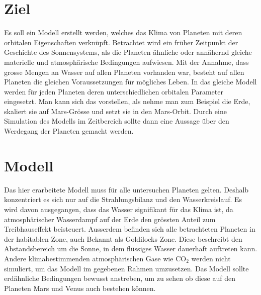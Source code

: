 \begin{refsection}

\section{Ziel}
Es soll ein Modell erstellt werden, welches das Klima von Planeten mit deren orbitalen Eigenschaften verknüpft.
Betrachtet wird ein früher Zeitpunkt der Geschichte des Sonnensystems, als die Planeten ähnliche oder annähernd gleiche materielle und atmosphärische Bedingungen aufwiesen.
Mit der Annahme, dass grosse Mengen an Wasser auf allen Planeten vorhanden war, besteht auf allen Planeten die gleichen Voraussetzungen für mögliches Leben.
In das gleiche Modell werden für jeden Planeten deren unterschiedlichen orbitalen Parameter eingesetzt. Man kann sich das vorstellen, als nehme man zum Beispiel die Erde, skaliert sie auf Mars-Grösse und setzt sie in den Mars-Orbit. 
Durch eine Simulation des Modells im Zeitbereich sollte dann eine Aussage über den Werdegang der Planeten gemacht werden.

\section{Modell}


	

	
	
	
	Das hier erarbeitete Modell muss für alle untersuchen Planeten gelten. Deshalb konzentriert es sich nur auf die Strahlungsbilanz und den Wasserkreislauf. Es wird davon ausgegangen, dass das Wasser signifikant für das Klima ist, da atmosphärischer Wasserdampf auf der Erde den grössten Anteil zum Treibhauseffekt beisteuert. Ausserdem befinden sich alle betrachteten Planeten in der habitablen Zone, auch Bekannt als Goldilocks Zone. Diese beschreibt den Abstandsbereich um die Sonne, in dem flüssiges Wasser dauerhaft auftreten kann.
	Andere klimabestimmenden atmosphärischen Gase wie $\text{CO}_\text{2}$ werden nicht simuliert, um das Modell im gegebenen Rahmen umzusetzen.
	Das Modell sollte erdähnliche Bedingungen bewusst anstreben, um zu sehen ob diese auf den Planeten Mars und Venus auch bestehen können.
	

\end{refsection}
